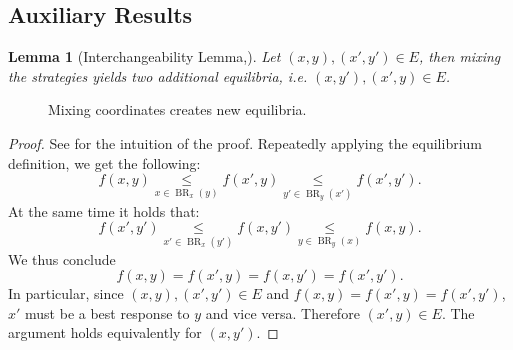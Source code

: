 \documentclass{article}
\newtheorem{lemma}{Lemma}
\DeclareMathOperator{\BR}{BR}
\begin{document}
\subsection{Auxiliary Results}
\label{sec:auxiliaryresults}

\begin{lemma}[Interchangeability Lemma,\citep{Nash1951Non}]
    \label{lem:addeq}
        Let $(x,y),(x',y')\in E$, then mixing the strategies yields two additional equilibria, i.e. $(x,y'),(x',y)\in E$.
    \end{lemma}
    \begin{figure}[H]
        \centering
        \caption{Mixing coordinates creates new equilibria.}
        \label{fig:equilibrium1d}
    \end{figure}
\begin{proof}[Proof]

        See  for the intuition of the proof.
            Repeatedly applying the equilibrium definition, we get the following:
            \[
            f(x,y)\underset{x \in \BR_x(y)}{\leq} f(x',y) \underset{y' \in \BR_y(x')}{\leq} f(x',y').
            \]
            At the same time it holds that:
                \[
            f(x',y')\underset{x' \in \BR_x(y')}{\leq} f(x,y') \underset{y \in \BR_y(x)}{\leq} f(x,y).
            \]
            We thus conclude
            \[
            f(x,y)=f(x',y)=f(x,y')=f(x',y').
            \]
        In particular, since $(x,y),(x',y')\in E$ and $f(x,y)=f(x',y)=f(x',y') $, $x'$ must be a best response to $y$ and vice versa. Therefore $(x',y) \in E$. The argument holds equivalently for $(x,y')$.

\end{proof}
\end{document}
